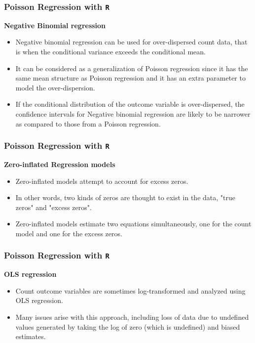 \documentclass[00-GLMregslides.tex]{subfiles}
\begin{document}
\begin{frame}[fragile]
\frametitle{Poisson Regression with \texttt{R}}
\Large	
\textbf{Negative Binomial regression}
\begin{itemize}
\item Negative binomial regression can be used for over-dispersed count data, that is when the conditional 
variance exceeds the conditional mean. 
\item It can be considered as a generalization of Poisson regression since it has the same mean structure as Poisson 
regression and it has an extra parameter to model the over-dispersion. 
\item If the conditional distribution of the outcome variable is over-dispersed, the confidence intervals for Negative binomial regression are likely to be narrower as compared to those from a Poisson regression.
\end{itemize}
\end{frame}
\begin{frame}[fragile]
\frametitle{Poisson Regression with \texttt{R}}
\Large
\textbf{Zero-inflated Regression models}
\begin{itemize}
\item Zero-inflated models attempt to account for excess zeros. 
\item In other words, two kinds of zeros are thought to exist in the data, "true zeros" and "excess zeros". 
\item Zero-inflated models estimate two equations simultaneously, one for the count model and one for the excess zeros.
\end{itemize}
\end{frame}
\begin{frame}[fragile]

\frametitle{Poisson Regression with \texttt{R}}
\Large
\textbf{OLS regression}
\begin{itemize}
\item Count outcome variables are sometimes log-transformed and analyzed using OLS regression. 
\item Many issues arise with this approach, including loss of data due to undefined values generated by taking the log of zero (which is undefined) and biased estimates.
\end{itemize}
\end{frame}
\end{document}
